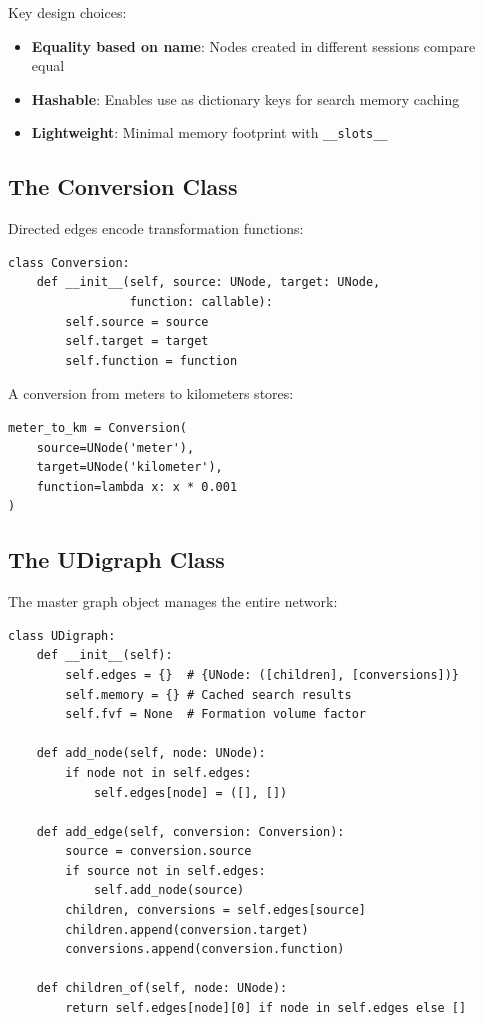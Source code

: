 \documentclass[11pt,a4paper]{report}
\begin{document}
Key design choices:
\begin{itemize}[leftmargin=*]
  \item \textbf{Equality based on name}: Nodes created in different sessions compare equal
  \item \textbf{Hashable}: Enables use as dictionary keys for search memory caching
  \item \textbf{Lightweight}: Minimal memory footprint with \texttt{\_\_slots\_\_}
\end{itemize}

\subsection{The Conversion Class}

Directed edges encode transformation functions:

\begin{lstlisting}[style=pythonstyle, caption={Conversion class structure}]
class Conversion:
    def __init__(self, source: UNode, target: UNode, 
                 function: callable):
        self.source = source
        self.target = target
        self.function = function
\end{lstlisting}

A conversion from meters to kilometers stores:
\begin{lstlisting}[style=pythonstyle]
meter_to_km = Conversion(
    source=UNode('meter'),
    target=UNode('kilometer'),
    function=lambda x: x * 0.001
)
\end{lstlisting}

\subsection{The UDigraph Class}

The master graph object manages the entire network:

\begin{lstlisting}[style=pythonstyle, caption={UDigraph core attributes}]
class UDigraph:
    def __init__(self):
        self.edges = {}  # {UNode: ([children], [conversions])}
        self.memory = {} # Cached search results
        self.fvf = None  # Formation volume factor
    
    def add_node(self, node: UNode):
        if node not in self.edges:
            self.edges[node] = ([], [])
    
    def add_edge(self, conversion: Conversion):
        source = conversion.source
        if source not in self.edges:
            self.add_node(source)
        children, conversions = self.edges[source]
        children.append(conversion.target)
        conversions.append(conversion.function)
    
    def children_of(self, node: UNode):
        return self.edges[node][0] if node in self.edges else []
\end{lstlisting}
\end{document}
